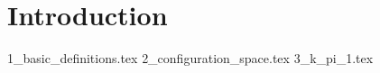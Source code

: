 \documentclass[class=article, crop=false]{standalone}
\begin{document}
\section{Introduction}	
{1_basic_definitions.tex}
{2_configuration_space.tex}
{3_k_pi_1.tex}
\end{document}
